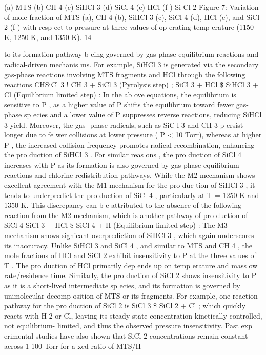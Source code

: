 \documentclass[10pt, letterpaper]{article}
\begin{document}
(a) MTS
(b) CH
4
(c) SiHCl
3
(d) SiCl
4
(e) HCl
(f ) Si Cl
2
Figure 7: Variation of mole fraction of MTS (a), CH
4
(b), SiHCl
3
(c), SiCl
4
(d), HCl (e), and SiCl
2
(f ) with resp ect to pressure
at three values of op erating temp erature (1150 K, 1250 K, and 1350 K).
14


to its formation pathway b eing governed by gas-phase equilibrium reactions and radical-driven mechanis ms.
For example, SiHCl
3
is generated via the secondary gas-phase reactions involving MTS fragments and HCl
through the following reactions
CHSiCl
3
!
CH
3
+ SiCl
3
(Pyrolysis step)
;
SiCl
3
+ HCl
\$
SiHCl
3
+ Cl (Equilibrium limited step)
:
In the ab ove equations, the equilibrium is sensitive to
P
, as a higher value of
P
shifts the equilibrium toward
fewer gas-phase sp ecies and a lower value of
P
suppresses reverse reactions, reducing SiHCl
3
yield. Moreover,
the gas- phase radicals, such as SiC l
3
and CH
3
p ersist longer due to fe wer collisions at lower pressure (
P <
10
Torr), whereas at higher
P
, the increased collision frequency promotes radical recombination, enhancing the
pro duction of SiHCl
3
. For similar reas ons , the pro duction of SiCl
4
increases with
P
as its formation is also
governed by gas-phase equilibrium reactions and chlorine redistribution pathways. While the M2 mechanism
shows excellent agreement with the M1 mechanism for the pro duc tion of SiHCl
3
, it tends to underpredict
the pro duction of SiCl
4
, particularly at
T
= 1250 K and 1350 K. This discrepancy can b e attributed to the
absence of the following reaction from the M2 mechanism, which is another pathway of pro duction of SiCl
4
SiCl
3
+ HCl
\$
SiCl
4
+ H (Equilibrium limited step)
:
The M3 mechanism shows signicant overprediction of SiHCl
3
, which again underscores its inaccuracy.
Unlike SiHCl
3
and SiCl
4
, and similar to MTS and CH
4
, the mole fractions of HCl and SiCl
2
exhibit
insensitivity to
P
at the three values of
T
. The pro duction of HCl primarily dep ends up on temp erature
and mass 
ow rate/residence time. Similarly, the pro duction of SiCl
2
shows insensitivity to
P
as it is a
short-lived intermediate sp ecies, and its formation is governed by unimolecular decomp osition of MTS or its
fragments. For example, one reaction pathway for the pro duction of SiCl
2
is
SiCl
3
\$
SiCl
2
+ Cl
;
which quickly reacts with H
2
or Cl, leaving its steady-state concentration kinetically controlled, not equilibrium-
limited, and thus the observed pressure insensitivity. Past exp erimental studies have also shown that SiCl
2
concentrations remain constant across 1-100 Torr for a xed ratio of MTS/H
\end{document}
